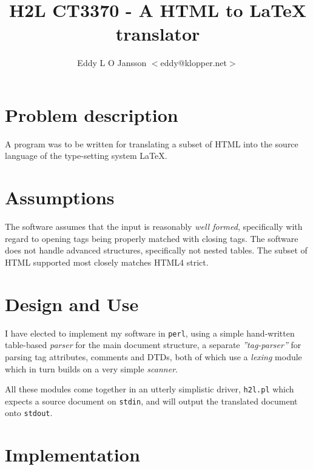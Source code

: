 \documentclass[a4paper,10pt]{article}
\title{H2L CT3370 - A HTML to LaTeX translator}
\author{Eddy L O Jansson $<$eddy@klopper.net$>$}
\begin{document}
\maketitle



\section{Problem description}



A program was to be written for translating a subset of
 HTML into the source language of the type-setting system LaTeX.



\section{Assumptions}



The software assumes that the input is reasonably \emph{well formed},
 specifically with regard to opening tags being properly matched
 with closing tags. The software does not handle advanced structures,
 specifically not nested tables. The subset of HTML supported most
 closely matches HTML4 strict.



\section{Design and Use}



I have elected to implement my software in \texttt{perl},
 using a simple hand-written table-based \emph{parser} for the main
 document structure, a separate \emph{''tag-parser''} for parsing
 tag attributes, comments and DTDs, both of which use a
 \emph{lexing} module which in turn builds on a very simple
 \emph{scanner}.



All these modules come together in an utterly simplistic driver,
 \texttt{h2l.pl} which expects a source document on \texttt{stdin},
 and will output the translated document onto \texttt{stdout}.



\section{Implementation}
\end{document}

